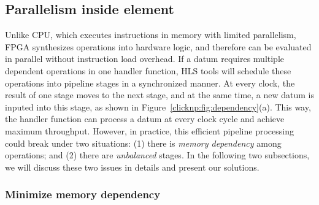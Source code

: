 \subsection{Parallelism inside element}
\label{clicknp:subsec:paral_in_elem}

%
%
Unlike CPU, which executes instructions in memory with limited parallelism, 
FPGA synthesizes operations into hardware logic, and therefore
can be evaluated in parallel without instruction load overhead.
If a datum requires multiple dependent
operations in one handler function, HLS tools will 
schedule these operations into pipeline stages in a synchronized manner. 
At every clock, the result of one stage moves to the next stage, and 
at the same time, a new datum is inputed into this stage, as shown in
Figure~\ref{clicknp:fig:dependency}(a).
This way, the handler function can process a datum at every clock cycle
and achieve maximum throughput.
%
However, in practice, this efficient pipeline processing 
could break under two situations: (1) there is \textit{memory dependency} among operations; 
and (2) there are \textit{unbalanced} stages.
%
In the following two subsections, we will discuss these two issues in 
details and present our solutions.



\subsubsection{Minimize memory dependency}

